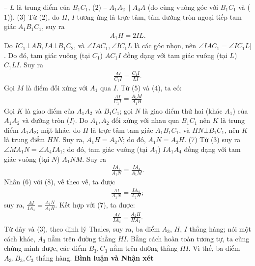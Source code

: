 \begin{multicols}{2}
	\vskip 0.05cm
	-- $L$ là trung điểm của $B_1C_1$, \hfill ($2$)
	\vskip 0.05cm
	-- $A_1A_2 \parallel A_4A$  (do cùng vuông góc với  $B_1C_1$ và ($1$)). \hfill($3$)
	\vskip 0.05cm
	Từ ($2$), do $H$, $I$ tương ứng là trực tâm, tâm đường tròn ngoại tiếp tam giác  $A_1B_1C_1$, suy ra
	\begin{align*}
		A_1H = 2IL. \tag{$4$}
	\end{align*}
	Do  $IC_1 \bot AB, IA \bot B_1C_2$, và  $\angle IAC_1, \angle IC_1L$ là các góc nhọn, nên $\angle IAC_1 = \angle IC_1L]$. Do đó, tam giác vuông (tại  $C_1$) $AC_1I$   đồng dạng với tam giác vuông (tại $L$) $C_1LI$.  Suy ra
	\begin{align*}
		\frac{{AI}}{{{C_1}I}} = \frac{{{C_1}I}}{{LI}}.\tag{$5$}
	\end{align*}
	Gọi $M$ là điểm đối xứng với $A_1$  qua $I$. Từ ($5$) và ($4$), ta có:
	\begin{align*}
		\frac{{AI}}{{{C_1}I}} = \frac{{{A_1}M}}{{{A_1}H}} \tag{$6$}
	\end{align*}
	Gọi $K$ là giao điểm của $A_1A_2$ và  $B_1C_1$; gọi $N$ là giao điểm thứ hai (khác $A_1$) của  $A_1A_2$ và đường tròn ($I$).
	\vskip 0.05cm
	Do $A_1, A_2$  đối xứng với nhau qua  $B_1C_1$ nên $K$ là trung điểm $A_1A_2$;  mặt khác, do $H$ là trực tâm tam giác $A_1B_1C_1$, và  $HN \bot B_1C_1$, nên $K$ là trung điểm $HN$. Suy ra, $A_1H = A_2N$; do đó, $A_1N = A_2H$. \hfill  ($7$)
	\vskip 0.05cm
	Từ ($3$) suy ra  $\angle MA_1N = \angle A_4IA_1$; do đó, tam giác vuông (tại  $A_1$) $IA_1A_4$ đồng dạng với tam giác vuông (tại $N$) $A_1NM$.  Suy ra
	\begin{align*}
		\frac{{I{A_1}}}{{{A_1}N}} = \frac{{I{A_4}}}{{{A_1}M}}. \tag{$8$}
	\end{align*}
	Nhân ($6$) với ($8$), vế theo vế, ta được
	\begin{align*}
		\frac{{AI}}{{{A_1}N}} = \frac{{I{A_4}}}{{{A_1}H}};
	\end{align*}
	suy ra,  $\frac{{AI}}{{I{A_4}}} = \frac{{{A_1}N}}{{{A_1}H}}$. Kết hợp với ($7$), ta được:
	\begin{align*}
		\frac{{AI}}{{I{A_4}}} = \frac{{{A_2}H}}{{H{A_1}}}.
	\end{align*}
	Từ đây và ($3$), theo định lý Thales, suy ra, ba điểm  $A_3$, $H$, $I$ thẳng hàng; nói một cách khác, $A_3$  nằm trên đường thẳng $HI$.
	\vskip 0.05cm
	Bằng cách hoàn toàn tương tự, ta cũng chứng minh được, các điểm $B_3, C_3$  nằm trên đường thẳng $HI$. Vì thế, ba điểm  $A_3, B_3 ,C_3$  thẳng hàng.
	\vskip 0.05cm
	\textbf{\color{thachthuctoanhoc}Bình luận và Nhận xét}

\end{multicols}
